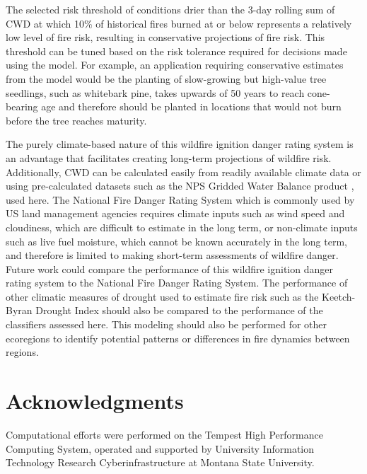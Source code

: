 \documentclass[11pt]{article}
\begin{document}
The selected risk threshold of conditions drier than the 3-day rolling sum of CWD at which 10\% of historical fires burned at or below represents a relatively low level of fire risk, resulting in conservative projections of fire risk.  This threshold can be tuned based on the risk tolerance required for decisions made using the model.  For example, an application requiring conservative estimates from the model would be the planting of slow-growing but high-value tree seedlings, such as whitebark pine, takes upwards of 50 years to reach cone-bearing age and therefore should be planted in locations that would not burn before the tree reaches maturity.

The purely climate-based nature of this wildfire ignition danger rating system is an advantage that facilitates creating long-term projections of wildfire risk. Additionally, CWD can be calculated easily from readily available climate data or using pre-calculated datasets such as the NPS Gridded Water Balance product \citep{tercekHistoricalChangesPlant2021}, used here. The National Fire Danger Rating System \citep{degrootChapter11Wildland2015} which is commonly used by US land management agencies requires climate inputs such as wind speed and cloudiness, which are difficult to estimate in the long term, or non-climate inputs such as live fuel moisture, which cannot be known accurately in the long term, and therefore is limited to making short-term assessments of wildfire danger. Future work could compare the performance of this wildfire ignition danger rating system to the National Fire Danger Rating System. The performance of other climatic measures of drought used to estimate fire risk such as the Keetch-Byran Drought Index \citep{degrootChapter11Wildland2015} should also be compared to the performance of the classifiers assessed here.  This modeling should also be performed for other ecoregions to identify potential patterns or differences in fire dynamics between regions. 

\section{Acknowledgments}

Computational efforts were performed on the Tempest High Performance Computing System, operated and supported by University Information Technology Research Cyberinfrastructure at Montana State University.


\clearpage

\printbibliography[
heading=bibintoc,
title={References}
]
\end{document}
